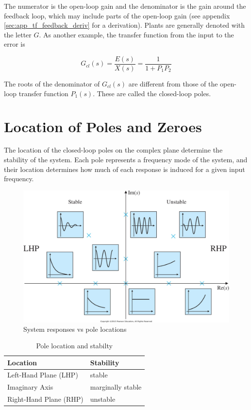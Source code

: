 \documentclass[10pt,conference,compsoc]{IEEEtran}
\begin{document}
The numerator is the \gls{open-loop gain} and the denominator is the gain around
the feedback loop, which may include parts of the \gls{open-loop gain} (see
appendix \ref{sec:app_tf_feedback_deriv} for a derivation). Plants are generally
denoted with the letter $G$. As another example, the transfer function from the
input to the error is

\begin{equation}
  G_{cl}(s) = \frac{E(s)}{X(s)} = \frac{1}{1 + P_1 P_2}
\end{equation}

The roots of the denominator of $G_{cl}(s)$ are different from those of the
open-loop transfer function $P_1(s)$. These are called the closed-loop poles.

\section{Location of Poles and Zeroes}

The location of the closed-loop poles on the complex plane determine the
stability of the \gls{system}. Each pole represents a frequency mode of the
\gls{system}, and their location determines how much of each response is induced
for a given input frequency.

\begin{figure}[H]
  \includegraphics[width=\linewidth]{figs/ResponseVsPoleLocations.png}
  \caption{System responses vs pole locations \cite{bib:pole_locations}}
\end{figure}

\begin{table}[ht]
  \caption{Pole location and stabilty}
  \renewcommand{\arraystretch}{1.5}
  \centering
  \begin{tabular}{|ll|}
    \hline
    \textbf{Location} & \textbf{Stability} \\
    \hline
    Left-Hand Plane (LHP) & stable \\
    Imaginary Axis & marginally stable \\
    Right-Hand Plane (RHP) & unstable \\
    \hline
  \end{tabular}
  \label{tab:pole_locations}
\end{table}
\end{document}
